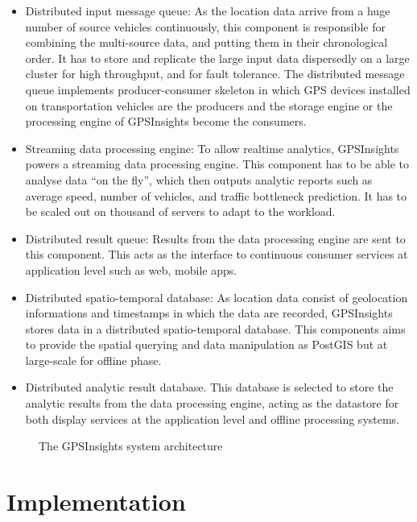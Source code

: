 \documentclass{acm_proc_article-sp}
\begin{document}
\begin{itemize}
\item 	Distributed input message queue: As the location data arrive from a huge number of source vehicles continuously, this component is responsible for combining the multi-source data, and putting them in their chronological order. It has to store and replicate the large input data dispersedly on a large cluster for high throughput, and for fault tolerance. The distributed message queue implements producer-consumer skeleton in which GPS devices installed on transportation vehicles are the producers and the storage engine or the processing engine of GPSInsights become the consumers.

\item  Streaming data processing engine: To allow realtime analytics, GPSInsights powers a streaming data processing engine. This component has to be able to analyse data ``on the fly'', which then outputs analytic reports such as average speed, number of vehicles, and traffic bottleneck prediction. It has to be scaled out on thousand of servers to adapt to the workload.

\item  Distributed result queue: Results from the data processing engine are sent to this component. This acts as the interface to continuous consumer services at application level such as web, mobile apps. 

\item  Distributed spatio-temporal database: As location data consist of geolocation informations and timestamps in which the data are recorded, GPSInsights stores data in a distributed spatio-temporal database. This components aims to provide the spatial querying and data manipulation as PostGIS but at large-scale for offline phase. 

\item  Distributed analytic result database. This database is selected to store the analytic results from the data processing engine, acting as the datastore for both display services at the application level and offline processing systems. 

\end{itemize}

\begin{figure}[h]
\centering
{}
\caption{The GPSInsights system architecture}
\label{architecture}
\end{figure}


\section{Implementation} 
\end{document}
